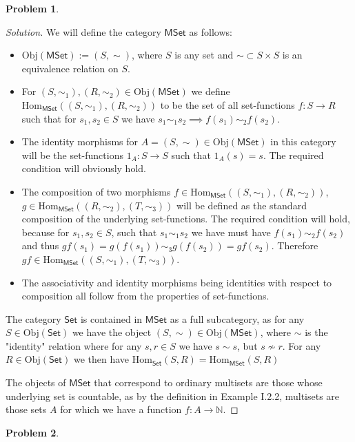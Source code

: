 \documentclass{article}
\theoremstyle{definition}
\newtheorem{problem-internal}{Problem}[subsection]
\newenvironment{problem}{
	\medskip
	\begin{problem-internal}
	}{
\end{problem-internal}
}
\newenvironment{solution}{
	\begin{proof}[Solution]
		\vspace{-8px}
		\setlength{\parskip}{4px}
		\setlength{\parindent}{0px}
	}{
\end{proof}
}
\newcommand{\Obj}{\mathrm{Obj}}
\newcommand{\Hom}{\mathrm{Hom}}
\begin{document}
\begin{problem}
\end{problem}

\begin{solution}
	We will define the category $\mathsf{MSet}$ as follows:
	\begin{itemize}
		\item $\Obj(\mathsf{MSet}) := (S, \sim)$, where $S$ is any set and $\sim \subset S \times S$ is an equivalence relation on $S$.
		\item For $(S, \sim_1), (R, \sim_2) \in \Obj(\mathsf{MSet})$ we define $\Hom_{\mathsf{MSet}}((S, \sim_1),(R, \sim_2))$ to be the set of all set-functions $f: S \to R$ such that for $s_1, s_2 \in S$ we have $s_1 \sim_1 s_2 \implies f(s_1) \sim_2 f(s_2)$.
		\item The identity morphisms for $A=(S, \sim) \in \Obj(\mathsf{MSet})$ in this category will be the set-functions $1_A: S \to S$ such that $1_A(s) = s$. The required condition will obviously hold.
		\item The composition of two morphisms $f \in \Hom_\mathsf{MSet}((S, \sim_1), (R, \sim_2))$, $g \in \Hom_\mathsf{MSet}((R, \sim_2),(T, \sim_3))$ will be defined as the standard composition of the underlying set-functions. The required condition will hold, because for $s_1, s_2 \in S$, such that $s_1 \sim_1 s_2$ we have must have $f(s_1) \sim_2 f(s_2)$ and thus $gf(s_1) = g(f(s_1)) \sim_3 g(f(s_2)) = gf(s_2)$. Therefore $gf \in \Hom_\mathsf{MSet}((S, \sim_1),(T, \sim_3))$.
		\item The associativity and identity morphisms being identities with respect to composition all follow from the properties of set-functions.
	\end{itemize}
	
	The category $\mathsf{Set}$ is contained in $\mathsf{MSet}$ as a full subcategory, as for any $S \in \Obj(\mathsf{Set})$ we have the object $(S, \sim) \in \Obj(\mathsf{MSet})$, where $\sim$ is the "identity" relation where for any $s,r \in S$ we have $s \sim s$, but $s \not \sim r$.  For any $R \in \Obj(\mathsf{Set})$ we then have $\Hom_\mathsf{Set}(S,R) = \Hom_\mathsf{MSet}(S,R)$
	
	The objects of $\mathsf{MSet}$ that correspond to ordinary multisets are those whose underlying set is countable, as by the definition in Example I.2.2, multisets are those sets $A$ for which we have a function $f: A \to \mathbb{N}$.
\end{solution}

\begin{problem}
\end{problem}
\end{document}
